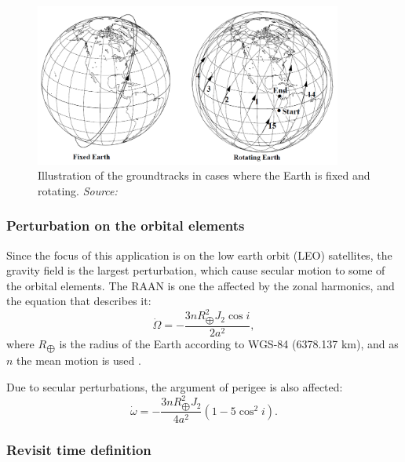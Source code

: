 \begin{figure}
\centering
\includegraphics[width=0.9\textwidth]{Images/groundtrack-fixed-rotating.png}\caption{Illustration of the groundtracks in cases where the Earth is fixed and rotating. \textit{Source: \cite{Vallado}}}
\label{groundtrack-fixed-rotating} 
\end{figure}

\bigskip
\subsubsection{Perturbation on the orbital elements}
\bigskip

Since the focus of this application is on the low earth orbit (LEO) satellites, the gravity field is the largest perturbation, which cause secular motion to some of the orbital elements. The RAAN is one the affected by the zonal harmonics, and the equation that describes it:
\begin{equation}
\dot{\Omega} = - \frac{3 n R_{\bigoplus}^{2} J_{2} \cos{i}}{2 a^{2}},
\end{equation}
where $R_{\bigoplus}$ is the radius of the Earth according to WGS-84 (6378.137 km), and as $n$ the mean motion is used \cite{Montenbruck}.

Due to secular perturbations, the argument of perigee is also affected:
\begin{equation}
\dot{\omega} = - \frac{3 n R_{\bigoplus}^{2} J_{2}}{4 a^{2}} (1 - 5 \cos^{2}{i}).
\end{equation}


\bigskip
\subsubsection{Revisit time definition}
\bigskip


